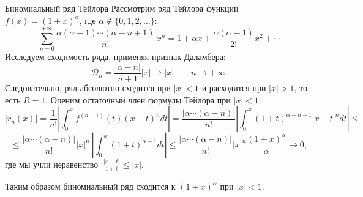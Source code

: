 \documentclass[8pt]{beamer}
\begin{document}
\begin{frame}{Биномиальный ряд Тейлора}
Рассмотрим ряд Тейлора функции $ f(x) =(1+x)^\alpha$, где $\alpha\notin\{0,1,2,\ldots\}$:
$$\sum_{n=0}^{+\infty}\frac{\alpha (\alpha-1)\cdots(\alpha-n+1)}{n!}\, x^n = 1+\alpha x+\frac{\alpha(\alpha-1)}{2!}x^2+\cdots$$
Исследуем сходимость ряда, применяя признак Даламбера:
$$\mathcal{D}_n = \frac{|\alpha -n|}{n+1} |x|\to |x|\qquad n\to+\infty.$$
Следовательно, ряд абсолютно сходится при $|x|<1$ и расходится при $|x|>1$, то есть $R=1$. Оценим остаточный член формулы Тейлора при $|x|<1$:
$$|r_n(x)|=\frac{1}{n!}\left|\int_0^x f^{(n+1)}(t)(x-t)^n dt\right|=
\frac{|\alpha \cdots(\alpha-n)|}{n!} \left|\int_0^x (1+t)^{\alpha-n-1} |x-t|^n dt\right| \le $$
$$\le \frac{|\alpha \cdots(\alpha-n)|}{n!} |x|^n\  \left|\int_0^x (1+t)^{\alpha-1} dt\right|\le \frac{|\alpha \cdots(\alpha-n)|}{n!} |x|^n \frac{(1+x)^{\alpha}}{\alpha}\to 0,$$
где мы учли неравенство $\ \displaystyle \frac{|x-t|}{1+t} \le |x|$.

Таким образом биномиальный ряд сходится к $(1+x)^\alpha$ при $|x|<1$.
\end{frame}
\end{document}
